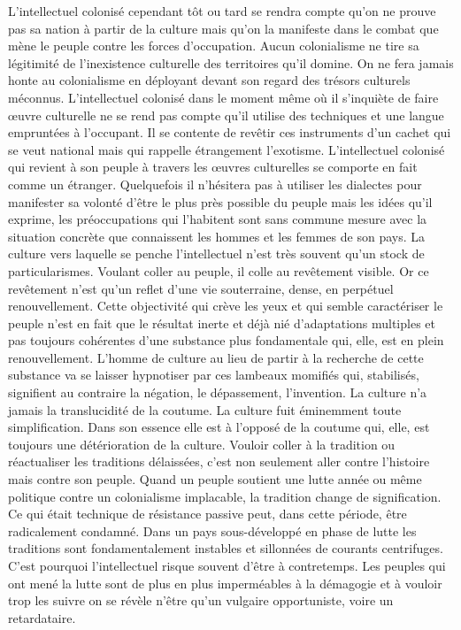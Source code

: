 \documentclass[french,twoside]{book} %
\begin{document}
\noindent L’intellectuel colonisé cependant tôt ou tard se rendra compte qu’on ne prouve pas sa nation à partir de la culture mais qu’on la manifeste dans le combat que mène le peuple contre les forces d’occupation. Aucun colonialisme ne tire sa légitimité de l’inexistence culturelle des territoires qu’il domine. On ne fera jamais honte au colonialisme en déployant devant son regard des trésors culturels méconnus. L’intellectuel colonisé dans le moment même où il s’inquiète de faire œuvre culturelle ne se rend pas compte qu’il utilise des techniques et une langue empruntées à l’occupant. Il se contente de revêtir ces instruments d’un cachet qui se veut national mais qui rappelle étrangement l’exotisme. L’intellectuel colonisé qui revient à son peuple à travers les œuvres culturelles se comporte en fait comme un étranger. Quelquefois il n’hésitera pas à utiliser les dialectes pour manifester sa volonté d’être le plus près possible du peuple mais les idées qu’il exprime, les préoccupations qui l’habitent sont sans commune mesure avec la situation concrète que connaissent les hommes et les femmes de son pays. La culture vers laquelle se penche l’intellectuel n’est très souvent qu’un stock de particularismes. Voulant coller au peuple, il colle au revêtement visible. Or ce revêtement n’est qu’un reflet d’une vie souterraine, dense, en perpétuel renouvellement. Cette objectivité qui crève les yeux et qui semble caractériser le peuple n’est en fait que le résultat inerte et déjà nié d’adaptations multiples et pas toujours cohérentes d’une substance plus fondamentale qui, elle, est en plein renouvellement. L’homme de culture au lieu de partir à la recherche de cette substance va se laisser hypnotiser par ces lambeaux momifiés qui, stabilisés, signifient au contraire la négation, le dépassement, l’invention. La culture n’a jamais la translucidité de la coutume. La culture   fuit éminemment toute simplification. Dans son essence elle est à l’opposé de la coutume qui, elle, est toujours une détérioration de la culture. Vouloir coller à la tradition ou réactualiser les traditions délaissées, c’est non seulement aller contre l’histoire mais contre son peuple. Quand un peuple soutient une lutte année ou même politique contre un colonialisme implacable, la tradition change de signification. Ce qui était technique de résistance passive peut, dans cette période, être radicalement condamné. Dans un pays sous-développé en phase de lutte les traditions sont fondamentalement instables et sillonnées de courants centrifuges. C’est pourquoi l’intellectuel risque souvent d’être à contretemps. Les peuples qui ont mené la lutte sont de plus en plus imperméables à la démagogie et à vouloir trop les suivre on se révèle n’être qu’un vulgaire opportuniste, voire un retardataire.\par
\end{document}
